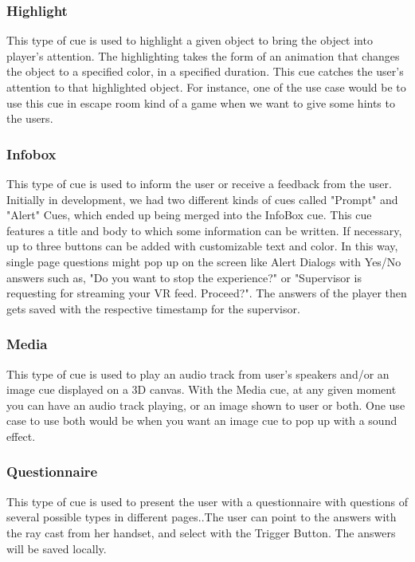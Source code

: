 \documentclass[conference]{IEEEtran}
\begin{document}
\subsubsection{Highlight}

This type of cue is used to highlight a given object to bring the object into player's attention. The highlighting takes the form of an animation that changes the object to a specified color, in a specified duration. This cue catches the user's attention to that highlighted object. For instance, one of the use case would be to use this cue in escape room kind of a game when we want to give some hints to the users.


\subsubsection{Infobox}

This type of cue is used to inform the user or receive a feedback from the user. Initially in development, we had two different kinds of cues called "Prompt" and "Alert" Cues, which ended up being merged into the InfoBox cue. This cue features a title and body to which some information can be written. If necessary, up to three buttons can be added with customizable text and color. In this way, single page questions might pop up on the screen like Alert Dialogs with Yes/No answers such as,  "Do you want to stop the experience?" or "Supervisor is requesting for streaming your VR feed. Proceed?". The answers of the player then gets saved with the respective timestamp for the supervisor.

\subsubsection{Media}

This type of cue is used to play an audio track from user's speakers and/or an image cue displayed on a 3D canvas. With the Media cue, at any given moment you can have an audio track playing, or an image shown to user or both. One use case to use both would be when you want an image cue to pop up with a sound effect.

\subsubsection{Questionnaire}

This type of cue is used to present the user with a questionnaire with questions of several possible types in different pages..The user can point to the answers with the ray cast from her handset, and select with the Trigger Button. The answers will be saved locally.
\end{document}
